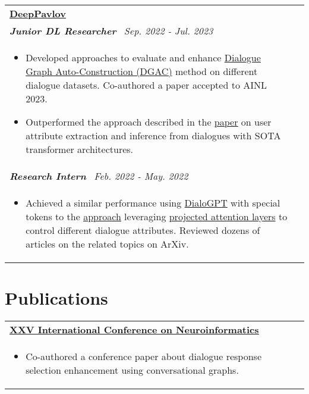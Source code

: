 \documentclass[a4paper,8pt]{article}
\begin{document}
\begin{tabularx}{\linewidth}{ @{}l r@{} }
\textbf{\uline{\href{https://deeppavlov.ai}{DeepPavlov}}} \\[4pt]
\color[HTML]{371e77}\textbf{\textit{Junior DL Researcher}}\ \hfill \color[HTML]{4B28A4} \textit{Sep. 2022 - Jul. 2023} \\[5pt]
\begin{minipage}[t]{\linewidth}
    \begin{itemize}[nosep,after=\strut, leftmargin=2em, itemsep=2pt]
        \item Developed approaches to evaluate and enhance \href{https://link.springer.com/chapter/10.1007/978-3-031-19032-2_52}{Dialogue Graph Auto-Construction (DGAC)} method on different dialogue datasets. Co-authored a paper accepted to AINL 2023.

        \item Outperformed the approach described in the \uline{\href{https://aclanthology.org/2020.lrec-1.73/}{paper}} on user attribute extraction and inference from dialogues with SOTA transformer architectures.
    \end{itemize}
\end{minipage} \\

\color[HTML]{371e77}\textbf{\textit{Research Intern}}\ \hfill \color[HTML]{4B28A4} \textit{Feb. 2022 - May. 2022} \\[5pt]
\begin{minipage}[t]{\linewidth}
    \begin{itemize}[nosep,after=\strut, leftmargin=2em, itemsep=2pt]
        \item Achieved a similar performance using \href{https://arxiv.org/abs/1911.00536}{DialoGPT} with special tokens to the \uline{\href{https://www.dialog-21.ru/media/5761/evseevdaplusetal052.pdf}{approach}} leveraging \href{https://arxiv.org/abs/1902.02671}{projected attention layers} to control different dialogue attributes. Reviewed dozens of articles on the related topics on ArXiv.
    \end{itemize}
\end{minipage}
\end{tabularx}

\section{Publications}

\begin{tabularx}{\linewidth}{ @{}l r@{} }
\color[HTML]{1C033C} \textbf{\uline{\href{https://link.springer.com/chapter/10.1007/978-3-031-44865-2_5}{XXV International Conference on Neuroinformatics}}}\\[5pt]
\begin{minipage}[t]{\linewidth}
    \begin{itemize}[nosep,after=\strut, leftmargin=2em, itemsep=2pt]
        \item Co-authored a conference paper about dialogue response selection enhancement using conversational graphs.
    \end{itemize}
    \end{minipage}
\end{tabularx}
\end{document}
